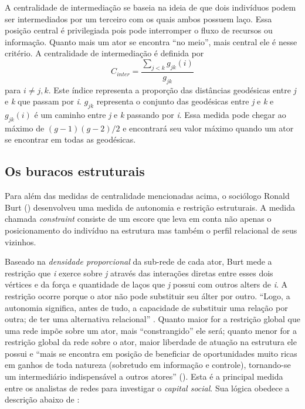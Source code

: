 \documentclass[a4paper, 12pt, openright, oneside, german, french, english, brazil]{abntex2}
\begin{document}
	A centralidade de intermediação se baseia na ideia de que dois indivíduos podem ser intermediados por um terceiro com os quais ambos possuem laço. Essa posição central é privilegiada pois pode interromper o fluxo de recursos ou informação. Quanto mais um ator se encontra ``no meio'', mais central ele é nesse critério. A centralidade de intermediação é definida por $$C_{inter} = \frac{\sum_{j<k} g_{jk} (i)}{g_{jk}}$$ para $i \neq j, k$. Este índice representa a proporção das distâncias geodésicas entre \textit{j} e \textit{k} que passam por \textit{i}. $g_{jk}$ representa o conjunto das geodésicas entre \textit{j} e \textit{k} e $g_{jk}(i)$ é um caminho entre \textit{j} e \textit{k} passando por \textit{i}. Essa medida pode chegar ao máximo de $(g-1)(g-2)/2$ e encontrará seu valor máximo quando um ator se encontrar em todas as geodésicas. 
	
	\subsection{Os buracos estruturais}

	Para além das medidas de centralidade mencionadas acima, o sociólogo Ronald Burt (\citeyear{burt1982toward,burt1992structural,burt2005brokerage}) desenvolveu uma medida de autonomia e restrição estruturais. A medida chamada \textit{constraint} consiste de um escore que leva em conta não apenas o posicionamento do indivíduo na estrutura mas também o perfil relacional de seus vizinhos. 
	
	Baseado na \textit{densidade proporcional} da sub-rede de cada ator, Burt mede a restrição que \textit{i} exerce sobre \textit{j} através das interações diretas entre esses dois vértices e da força e quantidade de laços que \textit{j} possui com outros alters de \textit{i}. A restrição ocorre porque o ator não pode substituir seu álter por outro. ``Logo, a autonomia significa, antes de tudo, a capacidade de substituir uma relação por outra; de ter uma alternativa relacional'' \cite[p. 71]{lazega2014redes}. Quanto maior for a restrição global que uma rede impõe sobre um ator, mais ``constrangido'' ele será; quanto menor for a restrição global da rede sobre o ator, maior liberdade de atuação na estrutura ele possui e ``mais se encontra em posição de beneficiar de oportunidades muito ricas em ganhos de toda natureza (sobretudo em informação e controle), tornando-se um intermediário indispensável a outros atores'' (). Esta é a principal medida entre os analistas de redes para investigar o \textit{capital social}. Sua lógica obedece a descrição abaixo de :
	
\end{document}
